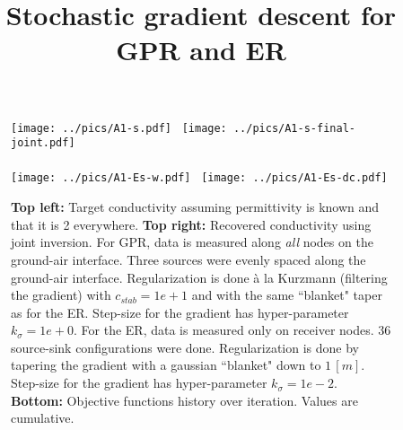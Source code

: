 \documentclass[a4paper,12pt]{article}
\title{Stochastic gradient descent for GPR and ER}
\author{}
\date{}
\begin{document}
\maketitle
%
\tiny{

}
\begin{figure}[t!]
\centering
\texttt{[image: ../pics/A1-s.pdf]}~
\texttt{[image: ../pics/A1-s-final-joint.pdf]}
\\~\\
\texttt{[image: ../pics/A1-Es-w.pdf]}~
\texttt{[image: ../pics/A1-Es-dc.pdf]}
\caption{{\bf Top left:} Target conductivity assuming permittivity is known and that it is 2 everywhere. 
{\bf Top right:} Recovered conductivity using joint inversion. 
For GPR, data is measured along {\it all} nodes on the ground-air interface. 
Three sources were evenly spaced along the ground-air interface. 
Regularization is done \`a la Kurzmann (filtering the gradient) with $c_{stab}=1e+1$ and 
with the same ``blanket" taper as for the ER. 
Step-size for the gradient has hyper-parameter $k_\sigma = 1e+0$. 
For the ER, data is measured only on receiver nodes. 
36 source-sink configurations were done. 
Regularization is done by tapering the gradient with a gaussian ``blanket" down to $1\,[m]$. 
Step-size for the gradient has hyper-parameter $k_\sigma = 1e-2$. 
{\bf Bottom:} Objective functions history over iteration. Values are cumulative.
}
\label{fig:fig1}
\end{figure}
%
\end{document}
